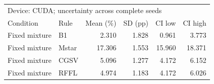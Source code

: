 \begin{tabular}{llrrrr}
\toprule
\multicolumn{6}{l}{Device: CUDA; uncertainty across complete seeds} \\
Condition & Rule & Mean (\%) & SD (pp) & CI low & CI high \\
\midrule
Fixed mixture & B1 & 2.310 & 1.828 & 0.961 & 3.773 \\
Fixed mixture & Mstar & 17.306 & 1.553 & 15.960 & 18.371 \\
Fixed mixture & CGSV & 5.096 & 1.277 & 4.172 & 6.152 \\
Fixed mixture & RFFL & 4.974 & 1.183 & 4.172 & 6.026 \\
\bottomrule
\end{tabular}
